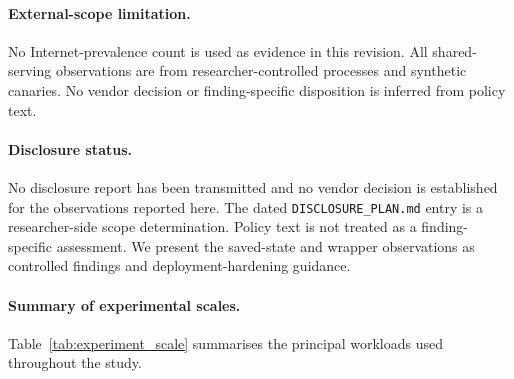 \paragraph{External-scope limitation.}
No Internet-prevalence count is used as evidence in this revision. All
shared-serving observations are from researcher-controlled processes and
synthetic canaries. No vendor decision or finding-specific disposition is
inferred from policy text.

\paragraph{Disclosure status.}
No disclosure report has been transmitted and no vendor decision is
established for the observations reported here. The dated
\texttt{DISCLOSURE\_PLAN.md} entry is a researcher-side scope determination.
Policy text is not treated as a finding-specific assessment. We present the
saved-state and wrapper observations as controlled findings and
deployment-hardening guidance.

\paragraph{Summary of experimental scales.}
Table~\ref{tab:experiment_scale} summarises the principal workloads used
throughout the study.

\begin{table}[!t]
    \centering
    \caption{Scale of the principal experimental workloads.}
    \label{tab:experiment_scale}
    \footnotesize
    \setlength{\tabcolsep}{4pt}
\end{table}


